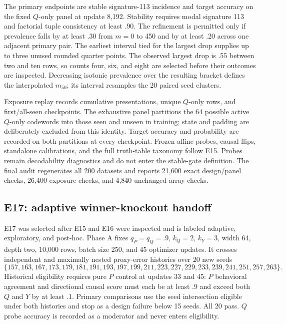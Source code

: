 \documentclass[11pt,a4paper]{article}
\begin{document}
The primary endpoints are stable signature-113 incidence and target accuracy on the fixed $Q$-only panel at update 8,192. Stability requires modal signature 113 and factorial tuple consistency at least .90. The refinement is permitted only if prevalence falls by at least .30 from $m=0$ to 450 and by at least .20 across one adjacent primary pair. The earliest interval tied for the largest drop supplies up to three unused rounded quarter points. The observed largest drop is .55 between two and ten rows, so counts four, six, and eight are selected before their outcomes are inspected. Decreasing isotonic prevalence over the resulting bracket defines the interpolated $m_{50}$; its interval resamples the 20 paired seed clusters.

Exposure replay records cumulative presentations, unique $Q$-only rows, and first/all-seen checkpoints. The exhaustive panel partitions the 64 possible active $Q$-only codewords into those seen and unseen in training; state and padding are deliberately excluded from this identity. Target accuracy and probability are recorded on both partitions at every checkpoint. Frozen affine probes, causal flips, standalone calibrations, and the full truth-table taxonomy follow E15. Probes remain decodability diagnostics and do not enter the stable-gate definition. The final audit regenerates all 200 datasets and reports 21,600 exact design/panel checks, 26,400 exposure checks, and 4,840 unchanged-array checks.

\subsection{E17: adaptive winner-knockout handoff}

E17 was selected after E15 and E16 were inspected and is labeled adaptive, exploratory, and post-hoc. Phase A fixes $q_P=q_Q=.9$, $k_Q=2$, $k_Y=3$, width 64, depth two, 10,000 rows, batch size 250, and 45 optimizer updates. It crosses independent and maximally nested proxy-error histories over 20 new seeds
\[
\{157,163,167,173,179,181,191,193,197,199,211,223,227,229,233,239,241,251,257,263\}.
\]
Historical eligibility requires pure $P$ control at updates 33 and 45: $P$ behavioral agreement and directional causal score must each be at least .9 and exceed both $Q$ and $Y$ by at least .1. Primary comparisons use the seed intersection eligible under both histories and stop as a design failure below 15 seeds. All 20 pass. $Q$ probe accuracy is recorded as a moderator and never enters eligibility.
\end{document}
